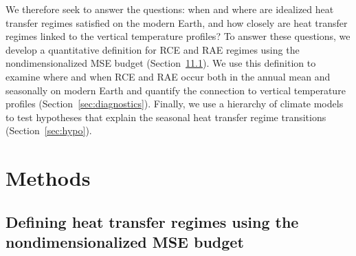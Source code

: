 \documentclass{ametsocV5}
\begin{document}

We therefore seek to answer the questions: when and where are idealized heat transfer regimes satisfied on the modern Earth, and how closely are heat transfer regimes linked to the vertical temperature profiles? To answer these questions, we develop a quantitative definition for RCE and RAE regimes using the nondimensionalized MSE budget (Section~\ref{sec:methods}\ref{subsec:mse}). We use this definition to examine where and when RCE and RAE occur both in the annual mean and seasonally on modern Earth and quantify the connection to vertical temperature profiles (Section~\ref{sec:diagnostics}). Finally, we use a hierarchy of climate models to test hypotheses that explain the seasonal heat transfer regime transitions (Section~\ref{sec:hypo}).


\section{Methods}\label{sec:methods}

    \subsection{Defining heat transfer regimes using the nondimensionalized MSE budget} \label{subsec:mse}
\end{document}
